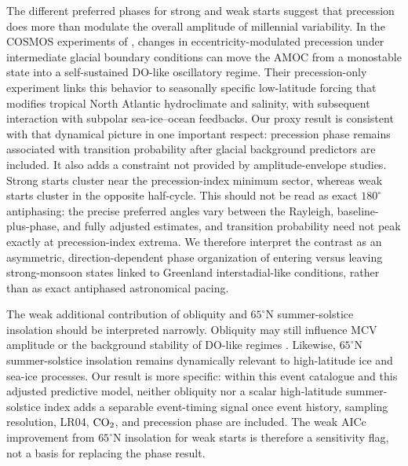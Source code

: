 \documentclass[11pt]{article}
\begin{document}
The different preferred phases for strong and weak starts suggest that precession does more than modulate the overall amplitude of millennial variability. In the COSMOS experiments of \citet{zhang2021direct}, changes in eccentricity-modulated precession under intermediate glacial boundary conditions can move the AMOC from a monostable state into a self-sustained DO-like oscillatory regime. Their precession-only experiment links this behavior to seasonally specific low-latitude forcing that modifies tropical North Atlantic hydroclimate and salinity, with subsequent interaction with subpolar sea-ice--ocean feedbacks. Our proxy result is consistent with that dynamical picture in one important respect: precession phase remains associated with transition probability after glacial background predictors are included. It also adds a constraint not provided by amplitude-envelope studies. Strong starts cluster near the precession-index minimum sector, whereas weak starts cluster in the opposite half-cycle. This should not be read as exact \(180^\circ\) antiphasing: the precise preferred angles vary between the Rayleigh, baseline-plus-phase, and fully adjusted estimates, and transition probability need not peak exactly at precession-index extrema. We therefore interpret the contrast as an asymmetric, direction-dependent phase organization of entering versus leaving strong-monsoon states linked to Greenland interstadial-like conditions, rather than as exact antiphased astronomical pacing.


The weak additional contribution of obliquity and \(65^\circ\)N summer-solstice insolation should be interpreted narrowly. Obliquity may still influence MCV amplitude or the background stability of DO-like regimes \citep{sun2021persistent,hodell20231,zhang2021direct,malmierca2023dansgaard}. Likewise, \(65^\circ\)N summer-solstice insolation remains dynamically relevant to high-latitude ice and sea-ice processes. Our result is more specific: within this event catalogue and this adjusted predictive model, neither obliquity nor a scalar high-latitude summer-solstice index adds a separable event-timing signal once event history, sampling resolution, LR04, \(\ce{CO2}\), and precession phase are included. The weak AICc improvement from \(65^\circ\)N insolation for weak starts is therefore a sensitivity flag, not a basis for replacing the phase result.
\end{document}
